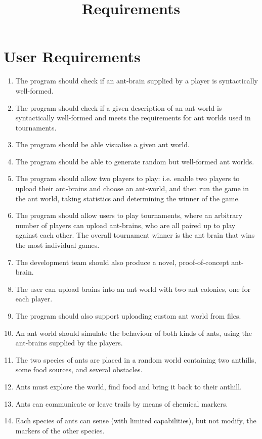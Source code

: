 \documentclass[11pt]{article}
\title{Requirements}
\date{}
\begin{document}
\maketitle
\tableofcontents
\newpage
\section{User Requirements}  

\begin{enumerate}
\item The program should check if an ant-brain supplied by a player is syntactically well-formed.
\item The program should check if a given description of an ant world is syntactically well-formed and meets the requirements for ant worlds used in tournaments.
\item The program should be able visualise a given ant world.
\item The program should be able to generate random but well-formed ant worlds.
\item The program should allow two players to play: i.e. enable two players to upload their ant-brains and choose an ant-world, and then run the game in the ant world, taking statistics and determining the winner of the game.
\item The program should allow users to play tournaments, where an arbitrary number of players can upload ant-brains, who are all paired up to play against each other. The overall tournament winner is the ant brain that wins the most individual games.
\item The development team should also produce a novel, proof-of-concept ant-brain.
\item The user can upload brains into an ant world with two ant colonies, one for each player.
\item The program should also support uploading custom ant world from files.
\item An ant world should simulate the behaviour of both kinds of ants, using the ant-brains supplied by the players.
\item The two species of ants are placed in a random world containing two anthills, some food sources, and several obstacles. 
\item Ants must explore the world, find food and bring it back to their anthill. 
\item Ants can communicate or leave trails by means of chemical markers.
\item Each species of ants can sense (with limited capabilities), but not modify, the markers of the other species.

\end{enumerate}
\end{document}
